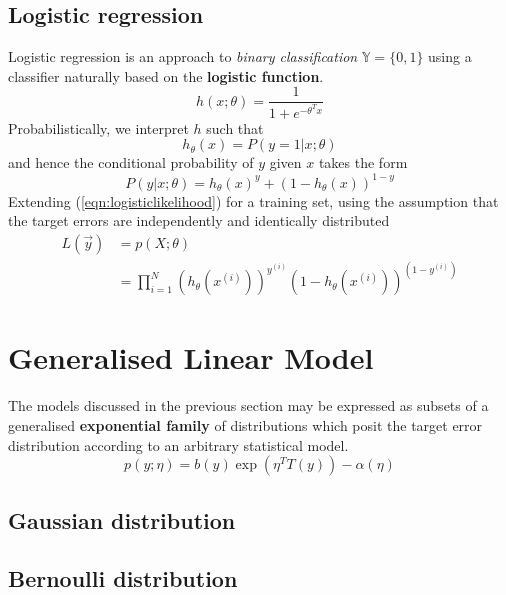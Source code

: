\documentclass{article}
\theoremstyle{definition}
\theoremstyle{remark}
\begin{document}
\subsection{Logistic regression}
Logistic regression is an approach to \textit{binary classification} $\mathbb{Y} = \{0,1\}$ using a classifier naturally based on the \textbf{logistic function}.
\begin{equation}
  h{(x; \theta)} = \frac{1}{1+e^{-\theta^{T}x}}
  \label{eqn:logisticclassifier}
\end{equation}
Probabilistically, we interpret $h$ such that 
\begin{equation}
  h_{\theta}(x) = P(y = 1 | x; \theta) 
  \label{eqn:logisticprobabilistic}
\end{equation}
and hence the conditional probability of $y$ given $x$ takes the form
\begin{equation}
  P(y|x; \theta) = h_{\theta}{(x)}^{y} + {\left( 1 - h_{\theta}(x) \right)}^{1-y}
  \label{eqn:logisticlikelihood}
\end{equation}
Extending (\ref{eqn:logisticlikelihood}) for a training set, using the assumption that the target errors are independently and identically distributed 
\begin{align}
  L{(\vec{y})} &= p(X; \theta) \nonumber \\
  &= \prod_{i=1}^{N}{{\left( h_{\theta}(x^{(i)}) \right)}^{y^{(i)}}}{\left( 1 - h_{\theta}(x^{(i)}) \right)}^{(1-y^{(i)})} 
\end{align}

\section{Generalised Linear Model}
The models discussed in the previous section may be expressed as subsets of a generalised \textbf{exponential family} of distributions which posit the target error distribution according to an arbitrary statistical model.
\begin{equation}
  p{(y;\eta)} = b{(y)}\exp{(\eta^{T}T(y))-\alpha(\eta)}
  \label{eqn:exponentialfamily}
\end{equation}
\subsection{Gaussian distribution}
\subsection{Bernoulli distribution}
\end{document}
